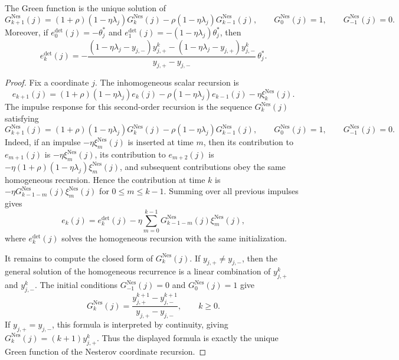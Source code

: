 \begin{proposition}
\label{prop:nes_impulse_response}
The Green function is the unique solution of
\[
    G_{k+1}^{\mathrm{Nes}}(j)
    =
    (1+\rho)(1-\eta\lambda_j)G_k^{\mathrm{Nes}}(j)
    -\rho(1-\eta\lambda_j)G_{k-1}^{\mathrm{Nes}}(j),
    \qquad
    G_0^{\mathrm{Nes}}(j)=1,
    \qquad
    G_{-1}^{\mathrm{Nes}}(j)=0.
\]
Moreover, if $e_0^{\mathrm{det}}(j)=-\theta_j^*$ and
$e_1^{\mathrm{det}}(j)=-(1-\eta\lambda_j)\theta_j^*$, then
\[
    e_k^{\mathrm{det}}(j)
    =
    -\frac{(1-\eta\lambda_j-y_{j,-})y_{j,+}^{k}
    -(1-\eta\lambda_j-y_{j,+})y_{j,-}^{k}}
    {y_{j,+}-y_{j,-}}\,\theta_j^* .
\]
\end{proposition}
\begin{proof}
Fix a coordinate $j$. The inhomogeneous scalar recursion is
\[
    e_{k+1}(j)
    =
    (1+\rho)(1-\eta\lambda_j)e_k(j)
    -\rho(1-\eta\lambda_j)e_{k-1}(j)
    -\eta \xi_k^{\mathrm{Nes}}(j).
\]
The impulse response for this second-order recursion is the sequence $G_k^{\mathrm{Nes}}(j)$ satisfying
\[
    G_{k+1}^{\mathrm{Nes}}(j)
    =
    (1+\rho)(1-\eta\lambda_j)G_k^{\mathrm{Nes}}(j)
    -\rho(1-\eta\lambda_j)G_{k-1}^{\mathrm{Nes}}(j),
    \qquad
    G_0^{\mathrm{Nes}}(j)=1,
    \qquad
    G_{-1}^{\mathrm{Nes}}(j)=0.
\]
Indeed, if an impulse $-\eta \xi_m^{\mathrm{Nes}}(j)$ is inserted at time $m$, then its contribution to
$e_{m+1}(j)$ is $-\eta\xi_m^{\mathrm{Nes}}(j)$, its contribution to $e_{m+2}(j)$ is
$-\eta(1+\rho)(1-\eta\lambda_j)\xi_m^{\mathrm{Nes}}(j)$, and subsequent contributions obey the same
homogeneous recursion. Hence the contribution at time $k$ is
$-\eta G_{k-1-m}^{\mathrm{Nes}}(j)\xi_m^{\mathrm{Nes}}(j)$ for $0\le m\le k-1$. Summing over all previous
impulses gives
\[
    e_k(j)
    =
    e_k^{\mathrm{det}}(j)
    -\eta\sum_{m=0}^{k-1}G_{k-1-m}^{\mathrm{Nes}}(j)\xi_m^{\mathrm{Nes}}(j),
\]
where $e_k^{\mathrm{det}}(j)$ solves the homogeneous recursion with the same initialization.

It remains to compute the closed form of $G_k^{\mathrm{Nes}}(j)$. If $y_{j,+}\neq y_{j,-}$, then the general
solution of the homogeneous recurrence is a linear combination of $y_{j,+}^k$ and $y_{j,-}^k$. The initial
conditions $G_{-1}^{\mathrm{Nes}}(j)=0$ and $G_0^{\mathrm{Nes}}(j)=1$ give
\[
    G_k^{\mathrm{Nes}}(j)
    =
    \frac{y_{j,+}^{k+1}-y_{j,-}^{k+1}}{y_{j,+}-y_{j,-}},
    \qquad k\ge0.
\]
If $y_{j,+}=y_{j,-}$, this formula is interpreted by continuity, giving
$G_k^{\mathrm{Nes}}(j)=(k+1)y_{j,+}^k$. Thus the displayed formula is exactly the unique Green function of
the Nesterov coordinate recursion.


\end{proof}
